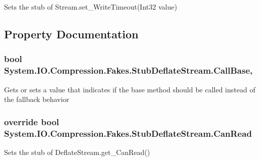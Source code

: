 Sets the stub of Stream.\-set\-\_\-\-Write\-Timeout(\-Int32 value)



\subsection{Property Documentation}
\hypertarget{class_system_1_1_i_o_1_1_compression_1_1_fakes_1_1_stub_deflate_stream_ab8cc4859e561b93e7a2a725f4bd66678}{
\subsubsection[{Call\-Base}]{\setlength{\rightskip}{0pt plus 5cm}bool System.\-I\-O.\-Compression.\-Fakes.\-Stub\-Deflate\-Stream.\-Call\-Base\hspace{0.3cm}{\ttfamily [get]}, {\ttfamily [set]}}}\label{class_system_1_1_i_o_1_1_compression_1_1_fakes_1_1_stub_deflate_stream_ab8cc4859e561b93e7a2a725f4bd66678}


Gets or sets a value that indicates if the base method should be called instead of the fallback behavior

\hypertarget{class_system_1_1_i_o_1_1_compression_1_1_fakes_1_1_stub_deflate_stream_abba1d1c7de0da92f97045c2f68e6fa2e}{
\subsubsection[{Can\-Read}]{\setlength{\rightskip}{0pt plus 5cm}override bool System.\-I\-O.\-Compression.\-Fakes.\-Stub\-Deflate\-Stream.\-Can\-Read\hspace{0.3cm}{\ttfamily [get]}}}\label{class_system_1_1_i_o_1_1_compression_1_1_fakes_1_1_stub_deflate_stream_abba1d1c7de0da92f97045c2f68e6fa2e}


Sets the stub of Deflate\-Stream.\-get\-\_\-\-Can\-Read()

